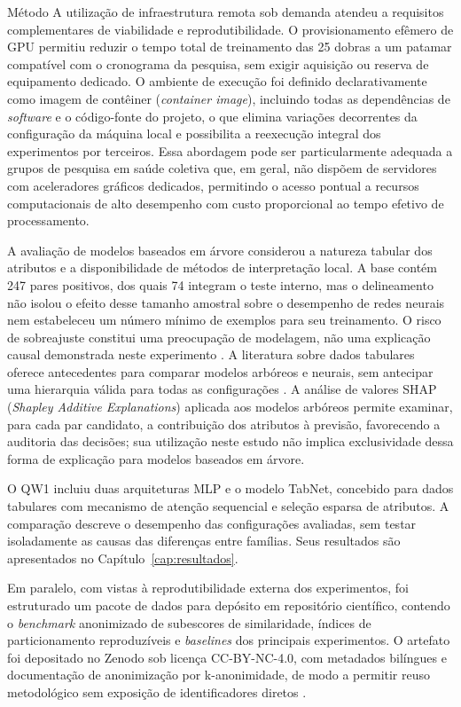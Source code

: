 \begin{chapter}{Método}
A utilização de infraestrutura remota sob demanda atendeu a requisitos complementares de viabilidade e reprodutibilidade. O provisionamento efêmero de GPU permitiu reduzir o tempo total de treinamento das 25 dobras a um patamar compatível com o cronograma da pesquisa, sem exigir aquisição ou reserva de equipamento dedicado. O ambiente de execução foi definido declarativamente como imagem de contêiner (\textit{container image}), incluindo todas as dependências de \textit{software} e o código-fonte do projeto, o que elimina variações decorrentes da configuração da máquina local e possibilita a reexecução integral dos experimentos por terceiros. Essa abordagem pode ser particularmente adequada a grupos de pesquisa em saúde coletiva que, em geral, não dispõem de servidores com aceleradores gráficos dedicados, permitindo o acesso pontual a recursos computacionais de alto desempenho com custo proporcional ao tempo efetivo de processamento.

A avaliação de modelos baseados em árvore considerou a natureza tabular dos atributos e a disponibilidade de métodos de interpretação local. A base contém 247 pares positivos, dos quais 74 integram o teste interno, mas o delineamento não isolou o efeito desse tamanho amostral sobre o desempenho de redes neurais nem estabeleceu um número mínimo de exemplos para seu treinamento. O risco de sobreajuste constitui uma preocupação de modelagem, não uma explicação causal demonstrada neste experimento \cite{Hastie2009elements}. A literatura sobre dados tabulares oferece antecedentes para comparar modelos arbóreos e neurais, sem antecipar uma hierarquia válida para todas as configurações \cite{Grinsztajn2022tabular,ShwartzZiv2022tabular}. A análise de valores SHAP (\textit{Shapley Additive Explanations}) \cite{Lundberg2017shap} aplicada aos modelos arbóreos permite examinar, para cada par candidato, a contribuição dos atributos à previsão, favorecendo a auditoria das decisões; sua utilização neste estudo não implica exclusividade dessa forma de explicação para modelos baseados em árvore.

O QW1 incluiu duas arquiteturas MLP e o modelo TabNet, concebido para dados tabulares com mecanismo de atenção sequencial e seleção esparsa de atributos. A comparação descreve o desempenho das configurações avaliadas, sem testar isoladamente as causas das diferenças entre famílias. Seus resultados são apresentados no Capítulo~\ref{cap:resultados}.

Em paralelo, com vistas à reprodutibilidade externa dos experimentos, foi estruturado um pacote de dados para depósito em repositório científico, contendo o \textit{benchmark} anonimizado de subescores de similaridade, índices de particionamento reproduzíveis e \textit{baselines} dos principais experimentos. O artefato foi depositado no Zenodo sob licença CC-BY-NC-4.0, com metadados bilíngues e documentação de anonimização por k-anonimidade, de modo a permitir reuso metodológico sem exposição de identificadores diretos \cite{Jardim2026zenodo}.


\end{chapter}
